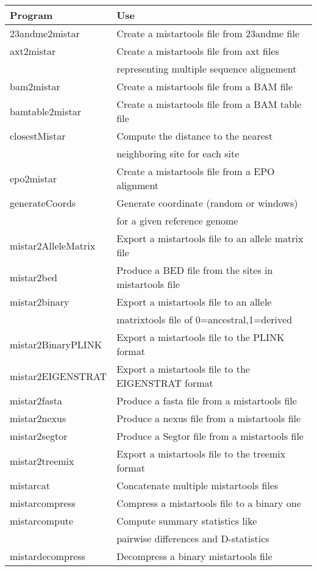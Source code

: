 \documentclass[a4paper]{article}
\begin{document}
\noindent \begin{tabular}{|l|l|}
\hline
Program & Use \\
\hline
23andme2mistar & Create a mistartools file from 23andme file \\
axt2mistar &  Create a mistartools file from axt files \\
           & representing multiple sequence alignement  \\
bam2mistar &  Create a mistartools file from a BAM file \\
bamtable2mistar & Create a mistartools file from a BAM table file \\
closestMistar & Compute the distance to the nearest \\ 
              & neighboring site for each site \\
epo2mistar & Create a mistartools file from a EPO alignment \\
generateCoords & Generate coordinate (random or windows) \\
               & for a given reference genome \\
mistar2AlleleMatrix & Export a mistartools file to an allele matrix file \\
mistar2bed &  Produce a BED file from the sites in mistartools file \\
mistar2binary & Export a mistartools file to an allele \\
              & matrixtools file of 0=ancestral,1=derived \\
mistar2BinaryPLINK &  Export a mistartools file to the PLINK format \\
mistar2EIGENSTRAT & Export a mistartools file to the EIGENSTRAT format \\
mistar2fasta & Produce a fasta file from a mistartools file \\
mistar2nexus & Produce a nexus file from a mistartools file \\
mistar2segtor & Produce a Segtor file from a mistartools file \\
mistar2treemix & Export a mistartools file to the treemix format \\
mistarcat &  Concatenate multiple mistartools files \\
mistarcompress & Compress a mistartools file to a binary one \\
mistarcompute & Compute summary statistics like \\
              & pairwise differences and D-statistics \\
mistardecompress & Decompress a binary mistartools file \\

\end{tabular}
\end{document}
